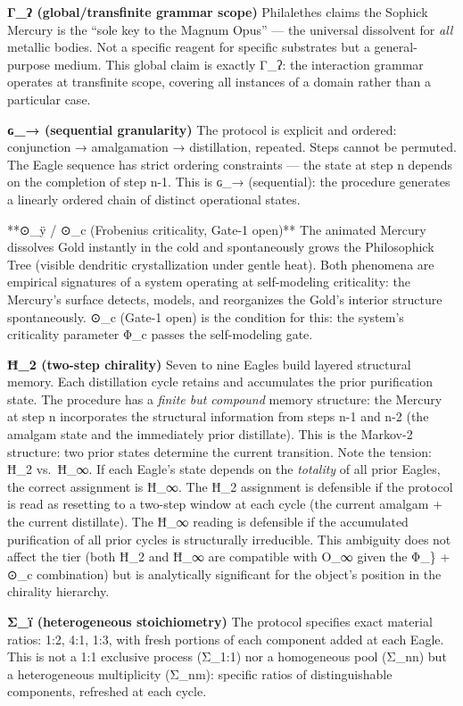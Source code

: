 \documentclass[
  11pt,
  a4paper,
]{article}
\begin{document}
\textbf{Γ\_ʔ (global/transfinite grammar scope)} Philalethes claims the
Sophick Mercury is the ``sole key to the Magnum Opus'' --- the universal
dissolvent for \emph{all} metallic bodies. Not a specific reagent for
specific substrates but a general-purpose medium. This global claim is
exactly Γ\_ʔ: the interaction grammar operates at transfinite scope,
covering all instances of a domain rather than a particular case.

\textbf{ɢ\_→ (sequential granularity)} The protocol is explicit and
ordered: conjunction → amalgamation → distillation, repeated. Steps
cannot be permuted. The Eagle sequence has strict ordering constraints
--- the state at step n depends on the completion of step n-1. This is
ɢ\_→ (sequential): the procedure generates a linearly ordered chain of
distinct operational states.

**⊙\_ÿ / ⊙\_c (Frobenius criticality, Gate-1 open)** The animated
Mercury dissolves Gold instantly in the cold and spontaneously grows the
Philosophick Tree (visible dendritic crystallization under gentle heat).
Both phenomena are empirical signatures of a system operating at
self-modeling criticality: the Mercury's surface detects, models, and
reorganizes the Gold's interior structure spontaneously. ⊙\_c (Gate-1
open) is the condition for this: the system's criticality parameter Φ\_c
passes the self-modeling gate.

\textbf{Ħ\_2 (two-step chirality)} Seven to nine Eagles build layered
structural memory. Each distillation cycle retains and accumulates the
prior purification state. The procedure has a \emph{finite but compound}
memory structure: the Mercury at step n incorporates the structural
information from steps n-1 and n-2 (the amalgam state and the
immediately prior distillate). This is the Markov-2 structure: two prior
states determine the current transition. Note the tension: Ħ\_2
vs.~Ħ\_∞. If each Eagle's state depends on the \emph{totality} of all
prior Eagles, the correct assignment is Ħ\_∞. The Ħ\_2 assignment is
defensible if the protocol is read as resetting to a two-step window at
each cycle (the current amalgam + the current distillate). The Ħ\_∞
reading is defensible if the accumulated purification of all prior
cycles is structurally irreducible. This ambiguity does not affect the
tier (both Ħ\_2 and Ħ\_∞ are compatible with O\_∞ given the Φ\_\} + ⊙\_c
combination) but is analytically significant for the object's position
in the chirality hierarchy.

\textbf{Σ\_ï (heterogeneous stoichiometry)} The protocol specifies exact
material ratios: 1:2, 4:1, 1:3, with fresh portions of each component
added at each Eagle. This is not a 1:1 exclusive process (Σ\_1:1) nor a
homogeneous pool (Σ\_nn) but a heterogeneous multiplicity (Σ\_nm):
specific ratios of distinguishable components, refreshed at each cycle.
\end{document}
